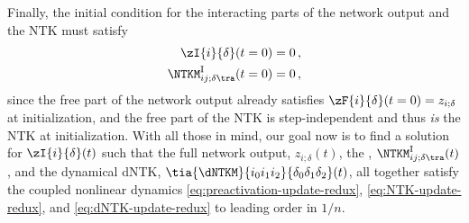 Finally, the initial condition for the interacting parts of the network output and the NTK must satisfy
\begin{align}\label{eq:interacting-piece-time-initial-condition}
\zI{i}{\delta}(t=0)=0\, ,\\
\NTKM^{\text{I}}_{ij ;\delta\tra}(t=0) =0 \, ,
\label{eq:interacting-piece-NTK-time-initial-condition}
\end{align}
since the free part of the network output already satisfies $\zF{i}{\delta}(t=0)=z_{i;\delta}$ at initialization, and the free part of the NTK is step-independent and thus \emph{is} the NTK at initialization.
With all those in mind, our goal now is to find a solution for $\zI{i}{\delta}(t)$ such that 
the full network output, $z_{i;\delta}(t)$, 
the , $\NTKM^{\text{I}}_{ij ;\delta\tra}(t)$, and the dynamical dNTK, $\tia{\dNTKM}{i_0i_1i_2}{\delta_0\delta_1\delta_2}(t)$, all together satisfy the coupled nonlinear dynamics \eqref{eq:preactivation-update-redux}, \eqref{eq:NTK-update-redux}, and \eqref{eq:dNTK-update-redux} to leading order in $1/n$.




